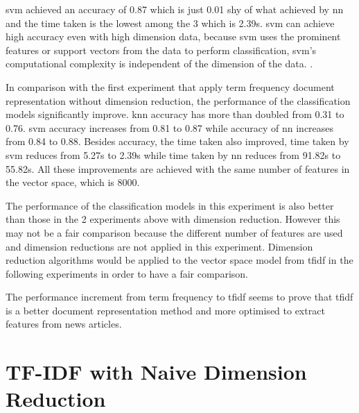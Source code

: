 \Ac{svm} achieved an accuracy of 0.87 which is just 0.01 shy of what achieved by \ac{nn} and the time taken is the lowest among the 3 which is 2.39s. \Ac{svm} can achieve high accuracy even with high dimension data, because \ac{svm} uses the prominent features or support vectors from the data to perform classification, \ac{svm}'s computational complexity is independent of the dimension of the data. \cite{dimRedCat}.

In comparison with the first experiment that apply term frequency document representation without dimension reduction, the performance of the classification models significantly improve. \Ac{knn} accuracy has more than doubled from 0.31 to 0.76. \Ac{svm} accuracy increases from 0.81 to 0.87 while accuracy of \ac{nn} increases from  0.84 to 0.88. Besides accuracy, the time taken also improved, time taken by \ac{svm} reduces from 5.27s to 2.39s while time taken by \ac{nn} reduces from 91.82s to 55.82s. All these improvements are achieved with the same number of features in the vector space, which is 8000. 

The performance of the classification models in this experiment is also better than those in the 2 experiments above with dimension reduction. However this may not be a fair comparison because the different number of features are used and dimension reductions are not applied in this experiment. Dimension reduction algorithms would be applied to the vector space model from \ac{tfidf} in the following experiments in order to have a fair comparison.

The performance increment from term frequency to \ac{tfidf} seems to prove that \ac{tfidf} is a better document representation method and more optimised to extract features from news articles.\\

\section{TF-IDF with Naive Dimension Reduction}

